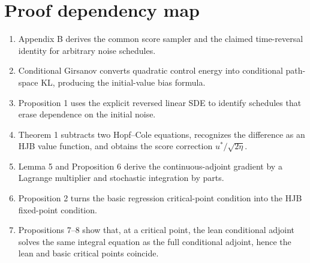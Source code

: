 \section*{Proof dependency map}
\begin{enumerate}[leftmargin=2em]
\item Appendix B derives the common score sampler and the claimed time-reversal identity for arbitrary noise schedules.
\item Conditional Girsanov converts quadratic control energy into conditional path-space KL, producing the initial-value bias formula.
\item Proposition 1 uses the explicit reversed linear SDE to identify schedules that erase dependence on the initial noise.
\item Theorem 1 subtracts two Hopf--Cole equations, recognizes the difference as an HJB value function, and obtains the score correction $u^*/\sqrt{2\eta}$.
\item Lemma 5 and Proposition 6 derive the continuous-adjoint gradient by a Lagrange multiplier and stochastic integration by parts.
\item Proposition 2 turns the basic regression critical-point condition into the HJB fixed-point condition.
\item Propositions 7--8 show that, at a critical point, the lean conditional adjoint solves the same integral equation as the full conditional adjoint, hence the lean and basic critical points coincide.
\end{enumerate}



